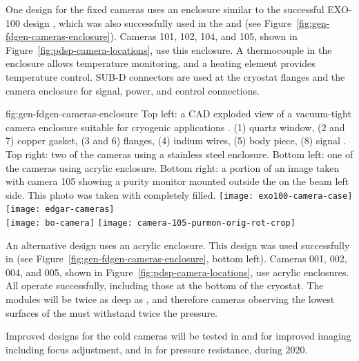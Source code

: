 One design for the  fixed cameras uses an enclosure similar to
the successful EXO-100 design \cite{Delaquis:2013hva}, which was also
successfully used in the 
and  (see Figure~\ref{fig:gen-fdgen-cameras-enclosure}). Cameras 101, 102, 104, and 105, shown in Figure~\ref{fig:pdsp-camera-locations}, use this enclosure.
A thermocouple in the enclosure allows temperature monitoring, and a heating element provides temperature control.  
SUB-D connectors are used at the cryostat flanges and the camera enclosure for signal, power, and control connections.

\begin{dunefigure}{fig:gen-fdgen-cameras-enclosure}
  {Top left: a CAD exploded view of a vacuum-tight camera enclosure suitable for cryogenic applications \cite{Delaquis:2013hva}.
    (1) quartz window, (2 and 7) copper gasket, (3 and 6) flanges, (4) indium wires, (5) body piece, (8) signal \fdth.
    Top right: two of the  cameras using a stainless steel enclosure. 
    Bottom left: one of the  cameras using acrylic enclosure.
    Bottom right: a portion of an image taken with  camera 105 showing a purity monitor mounted outside the  on the beam left side. This photo was taken with  completely filled.
  }
  \texttt{[image: exo100-camera-case]}%
  \texttt{[image: edgar-cameras]}\\
  \hfill \texttt{[image: bo-camera]}%
  \hfill \texttt{[image: camera-105-purmon-orig-rot-crop]}%
  \hfill
\end{dunefigure}

An alternative design uses an acrylic enclosure.
This design was used successfully in  (see Figure~\ref{fig:gen-fdgen-cameras-enclosure}, bottom left). Cameras 001, 002, 004, and 005, shown in Figure~\ref{fig:pdsp-camera-locations}, use acrylic enclosures. 
All operate successfully, including those at the bottom of the cryostat. %
The  modules will be twice as deep as , and therefore cameras observing the lowest surfaces of the  must withstand twice the pressure.

Improved designs for the cold cameras will be tested in  and  for improved imaging including focus adjustment, and in  for pressure resistance, during 2020. 



